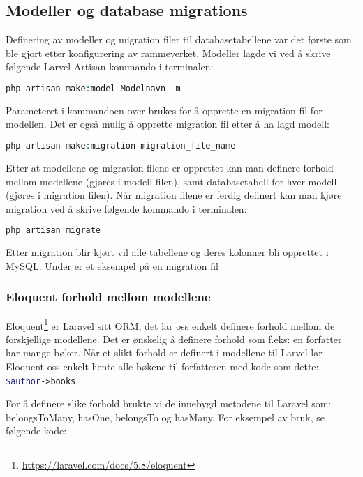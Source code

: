 \subsection{Modeller og database migrations}
Definering av modeller og migration filer til databasetabellene var det første som ble gjort etter konfigurering av rammeverket.
Modeller lagde vi ved å skrive følgende Larvel Artisan kommando i terminalen:
\begin{lstlisting}[caption={Laravel Artisan kommando for oppretting av modell og migration},language=php]
    php artisan make:model Modelnavn -m
\end{lstlisting}
Parameteret  i kommandoen over brukes for å opprette en migration fil for modellen. Det er også mulig å opprette migration fil etter å ha lagd modell:
\begin{lstlisting}[caption={Laravel Artisan kommando for oppretting av migration fil},language=php]
    php artisan make:migration migration_file_name
\end{lstlisting}
Etter at modellene og migration filene er opprettet kan man definere forhold mellom modellene (gjøres i modell filen), samt databasetabell for hver modell (gjøres i migration filen).
Når migration filene er ferdig definert kan man kjøre migration ved å skrive følgende kommando i terminalen:
\begin{lstlisting}[caption={Laravel Artisan kommando for å kjøre migration},language=php]
    php artisan migrate
\end{lstlisting}
Etter migration blir kjørt vil alle tabellene og deres kolonner bli opprettet i MySQL.
Under er et eksempel på en migration fil


\subsubsection{Eloquent forhold mellom modellene}
Eloquent\footnote{\url{https://laravel.com/docs/5.8/eloquent}} er Laravel sitt ORM, det lar oss enkelt definere forhold mellom de forskjellige modellene. Det er ønskelig å definere forhold som f.eks: en forfatter har mange bøker. Når et slikt forhold er definert i modellene til Larvel lar Eloquent oss enkelt hente alle bøkene til forfatteren med kode som dette: \lstinline[language=PHP]{$author->books}.

For å definere slike forhold brukte vi de innebygd metodene til Laravel som: belongsToMany, hasOne, belongsTo og hasMany. For eksempel av bruk, se følgende kode:


